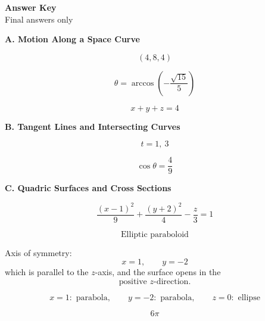 \documentclass[10pt]{article}
\newcommand{\answerbar}[1]{%
  \vspace{0.55em}%
  \noindent\colorbox{sectiongray}{%
    \parbox{\dimexpr\textwidth-2\fboxsep\relax}{%
      \strut\textbf{#1}\strut
    }%
  }%
  \par\vspace{0.50em}%
}
\begin{document}
\begin{center}
    {\Large\bfseries Answer Key}\\[0.28em]
    \small Final answers only
\end{center}

\vspace{0.30em}


\answerbar{A. Motion Along a Space Curve}

\begin{parts}

\item
\[
\boxed{(4,8,4)}
\]

\item
\[
\boxed{\theta=\arccos\left(-\frac{\sqrt{15}}5\right)}
\]

\item
\[
\boxed{x+y+z=4}
\]

\end{parts}

\vspace{0.25em}


\answerbar{B. Tangent Lines and Intersecting Curves}

\begin{parts}

\item
\[
\boxed{t=1,\ 3}
\]

\item
\[
\boxed{\cos\theta=\frac49}
\]

\end{parts}

\vspace{0.25em}


\answerbar{C. Quadric Surfaces and Cross Sections}

\begin{parts}

\item
\[
\boxed{
\frac{(x-1)^2}{9}
+
\frac{(y+2)^2}{4}
-
\frac{z}{3}
=1
}
\]

\[
\boxed{\text{Elliptic paraboloid}}
\]

Axis of symmetry:
\[
\boxed{x=1,\qquad y=-2}
\]
which is parallel to the $z$-axis, and the surface opens in the
\[
\boxed{\text{positive }z\text{-direction}}.
\]

\item
\[
\boxed{
x=1:\text{ parabola},
\qquad
y=-2:\text{ parabola},
\qquad
z=0:\text{ ellipse}
}
\]

\item
\[
\boxed{6\pi}
\]

\end{parts}
\end{document}
